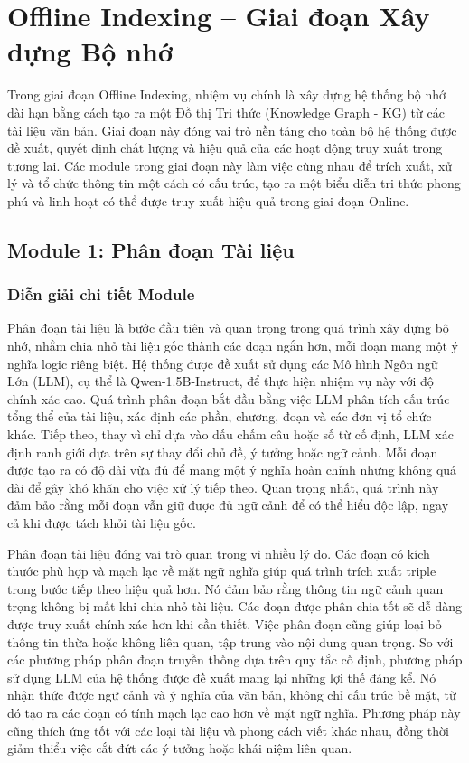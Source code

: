 \documentclass{article}
\begin{document}
\section{Offline Indexing – Giai đoạn Xây dựng Bộ nhớ}

Trong giai đoạn Offline Indexing, nhiệm vụ chính là xây dựng hệ thống bộ nhớ dài hạn bằng cách tạo ra một Đồ thị Tri thức (Knowledge Graph - KG) từ các tài liệu văn bản. Giai đoạn này đóng vai trò nền tảng cho toàn bộ hệ thống được đề xuất, quyết định chất lượng và hiệu quả của các hoạt động truy xuất trong tương lai. Các module trong giai đoạn này làm việc cùng nhau để trích xuất, xử lý và tổ chức thông tin một cách có cấu trúc, tạo ra một biểu diễn tri thức phong phú và linh hoạt có thể được truy xuất hiệu quả trong giai đoạn Online.

\subsection{Module 1: Phân đoạn Tài liệu}

\subsubsection{Diễn giải chi tiết Module}
Phân đoạn tài liệu là bước đầu tiên và quan trọng trong quá trình xây dựng bộ nhớ, nhằm chia nhỏ tài liệu gốc thành các đoạn ngắn hơn, mỗi đoạn mang một ý nghĩa logic riêng biệt. Hệ thống được đề xuất sử dụng các Mô hình Ngôn ngữ Lớn (LLM), cụ thể là Qwen-1.5B-Instruct, để thực hiện nhiệm vụ này với độ chính xác cao. Quá trình phân đoạn bắt đầu bằng việc LLM phân tích cấu trúc tổng thể của tài liệu, xác định các phần, chương, đoạn và các đơn vị tổ chức khác. Tiếp theo, thay vì chỉ dựa vào dấu chấm câu hoặc số từ cố định, LLM xác định ranh giới dựa trên sự thay đổi chủ đề, ý tưởng hoặc ngữ cảnh. Mỗi đoạn được tạo ra có độ dài vừa đủ để mang một ý nghĩa hoàn chỉnh nhưng không quá dài để gây khó khăn cho việc xử lý tiếp theo. Quan trọng nhất, quá trình này đảm bảo rằng mỗi đoạn vẫn giữ được đủ ngữ cảnh để có thể hiểu độc lập, ngay cả khi được tách khỏi tài liệu gốc.

Phân đoạn tài liệu đóng vai trò quan trọng vì nhiều lý do. Các đoạn có kích thước phù hợp và mạch lạc về mặt ngữ nghĩa giúp quá trình trích xuất triple trong bước tiếp theo hiệu quả hơn. Nó đảm bảo rằng thông tin ngữ cảnh quan trọng không bị mất khi chia nhỏ tài liệu. Các đoạn được phân chia tốt sẽ dễ dàng được truy xuất chính xác hơn khi cần thiết. Việc phân đoạn cũng giúp loại bỏ thông tin thừa hoặc không liên quan, tập trung vào nội dung quan trọng. So với các phương pháp phân đoạn truyền thống dựa trên quy tắc cố định, phương pháp sử dụng LLM của hệ thống được đề xuất mang lại những lợi thế đáng kể. Nó nhận thức được ngữ cảnh và ý nghĩa của văn bản, không chỉ cấu trúc bề mặt, từ đó tạo ra các đoạn có tính mạch lạc cao hơn về mặt ngữ nghĩa. Phương pháp này cũng thích ứng tốt với các loại tài liệu và phong cách viết khác nhau, đồng thời giảm thiểu việc cắt đứt các ý tưởng hoặc khái niệm liên quan.
\end{document}
